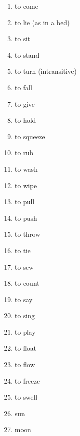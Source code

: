 \documentclass[a5,landscape]{article}
\begin{document}
{\begin{multicols}{4}
\begin{enumerate}
\item   to come 

\item   to lie (as in a bed) 

\item   to sit 

\item   to stand 

\item   to turn (intransitive) 

\item   to fall 

\item   to give 

\item   to hold 

\item   to squeeze 

\item   to rub 

\item   to wash 

\item   to wipe 

\item   to pull 

\item   to push 

\item   to throw 

\item   to tie 

\item   to sew 

\item   to count 

\item   to say 

\item   to sing 

\item   to play 

\item   to float 

\item   to flow 

\item   to freeze 

\item   to swell 

\item   sun 

\item   moon 


\end{enumerate}
\end{multicols}}
\end{document}
